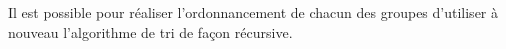 Il est possible pour réaliser l'ordonnancement de chacun des groupes d'utiliser à nouveau l'algorithme de tri de façon récursive.

%
%
%
%
%
%
